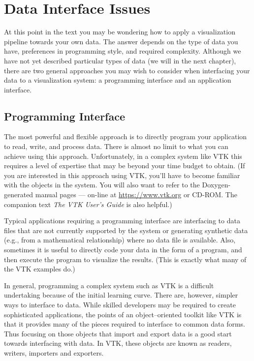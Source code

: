 \section{Data Interface Issues}
\label{sec:data_interface_issues}

At this point in the text you may be wondering how to apply a visualization pipeline towards your own data. The answer depends on the type of data you have, preferences in programming style, and required complexity. Although we have not yet described particular types of data (we will in the next chapter), there are two general approaches you may wish to consider when interfacing your data to a visualization system: a programming interface and an application interface.

\subsection{Programming Interface}
\label{subsec:programming_interface}

The most powerful and flexible approach is to directly program your application to read, write, and process data. There is almost no limit to what you can achieve using this approach. Unfortunately, in a complex system like VTK this requires a level of expertise that may be beyond your time budget to obtain. (If you are interested in this approach using VTK, you'll have to become familiar with the objects in the system. You will also want to refer to the Doxygen-generated manual pages --- on-line at \href{https://www.vtk.org}{https://www.vtk.org} or CD-ROM. The companion text \emph{The VTK User's Guide} is also helpful.)

Typical applications requiring a programming interface are interfacing to data files that are not currently supported by the system or generating synthetic data (e.g., from a mathematical relationship) where no data file is available. Also, sometimes it is useful to directly code your data in the form of a program, and then execute the program to visualize the results. (This is exactly what many of the VTK examples do.)

In general, programming a complex system such as VTK is a difficult undertaking because of the initial learning curve. There are, however, simpler ways to interface to data. While skilled developers may be required to create sophisticated applications, the points of an object--oriented toolkit like VTK is that it provides many of the pieces required to interface to common data forms. Thus focusing on those objects that import and export data is a good start towards interfacing with data. In VTK, these objects are known as readers, writers, importers and exporters.

